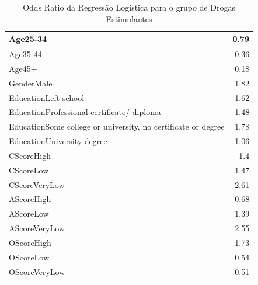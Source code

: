 \documentclass[
	article,			%
	11pt,				%
	oneside,			%
	a4paper,			%
	english,			%
	brazil,				%
	sumario=tradicional
	]{abntex2}
\begin{document}
\begin{table}[H]											
\centering											
\begin{tabular}{|l|r|}											
\hline											
Age25-34	&	0.79	\\	\hline							
Age35-44	&	0.36	\\	\hline							
Age45+	&	0.18	\\	\hline							
GenderMale	&	1.82	\\	\hline							
EducationLeft	school	&	1.62	\\	\hline						
EducationProfessional	certificate/	diploma	&	1.48	\\	\hline					
EducationSome	college	or	university,	no	certificate	or	degree	&	1.78	\\	\hline
EducationUniversity	degree	&	1.06	\\	\hline						
CScoreHigh	&	1.4	\\	\hline							
CScoreLow	&	1.47	\\	\hline							
CScoreVeryLow	&	2.61	\\	\hline							
AScoreHigh	&	0.68	\\	\hline							
AScoreLow	&	1.39	\\	\hline							
AScoreVeryLow	&	2.55	\\	\hline							
OScoreHigh	&	1.73	\\	\hline							
OScoreLow	&	0.54	\\	\hline							
OScoreVeryLow	&	0.51	\\	\hline							
\end{tabular}											
\caption{Odds Ratio	da	Regressão	Logística	para	o	grupo	de	Drogas	Estimulantes}		
\label{oddsratio_reglog_stimulants}											
\end{table}											
\end{document}
